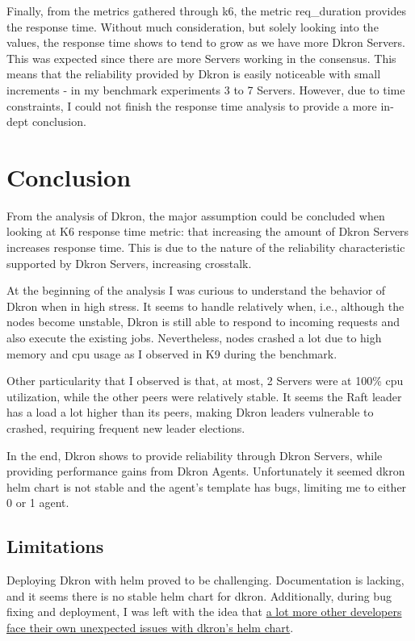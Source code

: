 \documentclass[runningheads]{llncs}
\begin{document}
Finally, from the metrics gathered through k6, the metric req\_duration provides the response
time. Without much consideration, but solely looking into the values, the response time shows to
tend to grow as we have more Dkron Servers. This was expected since there are more Servers working
in the consensus. This means that the reliability provided by Dkron is easily noticeable with small
increments - in my benchmark experiments 3 to 7 Servers. However, due to time constraints, I
could not finish the response time analysis to provide a more in-dept conclusion.

\section{Conclusion}
\label{conclusion}

From the analysis of Dkron, the major assumption could be concluded when looking at K6 response time
metric: that increasing the amount of Dkron Servers increases response time. This is due
to the nature of the reliability characteristic supported by Dkron Servers, increasing crosstalk.

At the beginning of the analysis I was curious to understand the behavior of Dkron when
in high stress. It seems to handle relatively when, i.e., although the nodes become unstable,
Dkron is still able to respond to incoming requests and also execute the existing jobs. Nevertheless,
nodes crashed a lot due to high memory and cpu usage as I observed in K9 during the benchmark.

Other particularity that I observed is that, at most, 2 Servers were at 100\% cpu utilization, while
the other peers were relatively stable. It seems the Raft leader has a load a lot higher than its
peers, making Dkron leaders vulnerable to crashed, requiring frequent new leader elections.

In the end, Dkron shows to provide reliability through Dkron Servers, while providing performance gains
from Dkron Agents. Unfortunately it seemed dkron helm chart is not stable and the agent's template has bugs,
limiting me to either 0 or 1 agent.


\subsection{Limitations}
Deploying Dkron with helm proved to be challenging. Documentation is lacking, and
it seems there is no stable helm chart for dkron. Additionally, during bug fixing and deployment,
I was left with the idea that \href{https://github.com/distribworks/dkron/issues?q=helm}{a lot more other developers face their own
unexpected issues with dkron's helm chart}.
\end{document}
